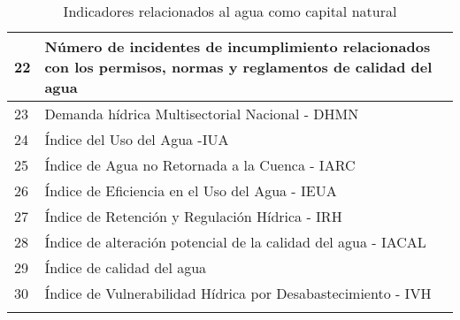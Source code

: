 \begin{longtable}{p{1.75cm}|p{13cm}}
22                                    & Número de incidentes de incumplimiento relacionados con los permisos, normas y reglamentos de calidad del agua                                             \\ \hline
23                                    & Demanda hídrica Multisectorial Nacional - DHMN                                                                                                      \\ \hline
24                                    & Índice del Uso del Agua -IUA                                                                                                                          \\ \hline
25                                    & Índice de Agua no Retornada a la Cuenca - IARC                                                                                                \\ \hline
26                                    & Índice de Eficiencia en el Uso del Agua - IEUA                                                                                                 \\ \hline
27                                    & Índice de Retención y Regulación Hídrica - IRH                                                                                                      \\ \hline
28                                    & Índice de alteración potencial de la calidad del agua - IACAL                                                                                \\ \hline
29                                    & Índice de calidad del agua                                                                                                                     \\ \hline
30                                    & Índice de Vulnerabilidad Hídrica por Desabastecimiento - IVH  \\                                                            
        \hline
    \caption{Indicadores relacionados al agua como capital natural}
    \label{tab:indicadores}
    \end{longtable}
    
